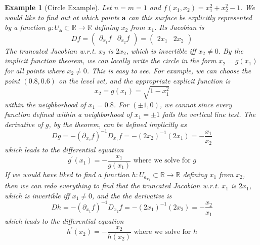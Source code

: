 \documentclass{article}
\newtheorem{example}{Example}[section]
\theoremstyle{remark}
\theoremstyle{definition}
\begin{document}
\begin{example}[Circle Example]
Let $n = m = 1$ and $f(x_1, x_2) = x_1^2 + x_2^2 - 1$. We would like to find out at which points $\mathbf{a}$ can this surface be explicitly represented by a function $g: U_\mathbf{a} \subset \mathbb{R} \longrightarrow \mathbb{R}$ defining $x_2$ from $x_1$. Its Jacobian is 
\[D f = \begin{pmatrix} \partial_{x_1} f & \partial_{x_2} f \end{pmatrix} = \begin{pmatrix} 2 x_1 & 2x_2 \end{pmatrix} \]
The truncated Jacobian w.r.t. $x_2$ is $2 x_2$, which is invertible iff $x_2 \neq 0$. By the implicit function theorem, we can locally write the circle in the form $x_2 = g(x_1)$ for all points where $x_2 \neq 0$. This is easy to see. For example, we can choose the point $(0.8, 0.6)$ on the level set, and the appropriate explicit function is 
\[x_2 = g(x_1) = \sqrt{1 - x_1^2}\]
within the neighborhood of $x_1 = 0.8$. For $(\pm 1, 0)$, we cannot since every function defined within a neighborhood of $x_1 = \pm 1$ fails the vertical line test. The derivative of $g$, by the theorem, can be defined implicitly as 
\[D g = - ( \partial_{x_2} f)^{-1} D_{x_1} f = - (2 x_2)^{-1} (2 x_1) = -\frac{x_1}{x_2}\]
which leads to the differential equation 
\[g^\prime (x_1) = - \frac{x_1}{g(x_1)} \text{ where we solve for } g\]
If we would have liked to find a function $h: U_{a_{\mathbf{x}_2}} \subset \mathbb{R} \longrightarrow \mathbb{R}$ defining $x_1$ from $x_2$, then we can redo everything to find that the truncated Jacobian w.r.t. $x_1$ is $2x_1$, which is invertible iff $x_1 \neq 0$, and the the derivative is 
\[D h = - (\partial_{x_1} f)^{-1} D_{x_2} f = - (2x_1)^{-1} (2x_2) = -\frac{x_2}{x_1}\]
which leads to the differential equation 
\[h^\prime (x_2) = - \frac{x_2}{h(x_2)} \text{ where we solve for } h\]
\end{example}
\end{document}
